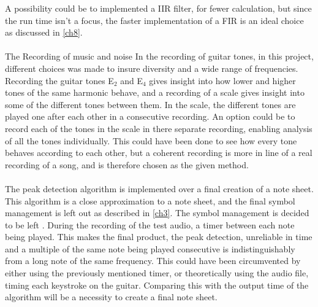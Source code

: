 A possibility could be to implemented a IIR filter, for fewer calculation, but since the run time isn't a focus, the faster implementation of a FIR is an ideal choice as discussed in \ref{ch8}.
\\\\
The Recording of music and noise 
In the recording of guitar tones, in this project, different choices was made to insure diversity and a wide range of frequencies.
Recording the guitar tones E$_2$ and E$_4$ gives insight into how lower and higher tones of the same harmonic behave, and a recording of a scale gives insight into some of the different tones between them.
In the scale, the different tones are played one after each other in a consecutive recording. 
An option could be to record each of the tones in the scale in there separate recording, enabling analysis of all the tones individually.
This could have been done to see how every tone behaves according to each other, but a coherent recording is more in line of a real recording of a song, and is therefore chosen as the given method.
\\\\
The peak detection algorithm is implemented over a final creation of a note sheet.
This algorithm is a close approximation to a note sheet, and the final symbol management is left out as described in \ref{ch3}.
The symbol management is decided to be left .
During the recording of the test audio, a timer between each note being played.
This makes the final product, the peak detection, unreliable in time and a multiple of the same note being played consecutive is indistinguishably from a long note of the same frequency.
This could have been circumvented by either using the previously mentioned timer, or theoretically using the audio file, timing each keystroke on the guitar.
Comparing this with the output time of the algorithm will be a necessity to create a final note sheet.





